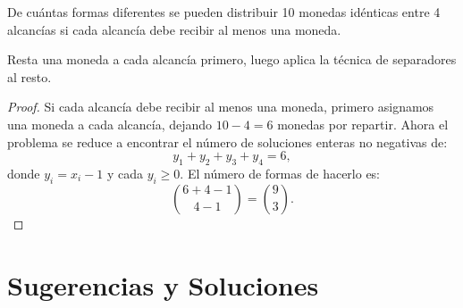\documentclass[11pt]{scrartcl}
\begin{document}
\begin{problem}
De cuántas formas diferentes se pueden distribuir 10 monedas idénticas entre 4 alcancías si cada alcancía debe recibir al menos una moneda.
\begin{hint}
Resta una moneda a cada alcancía primero, luego aplica la técnica de separadores al resto.
\begin{proof}
Si cada alcancía debe recibir al menos una moneda, primero asignamos una moneda a cada alcancía, dejando \(10 - 4 = 6\) monedas por repartir. Ahora el problema se reduce a encontrar el número de soluciones enteras no negativas de:
\[ y_1 + y_2 + y_3 + y_4 = 6, \]
donde \(y_i = x_i - 1\) y cada \(y_i \geq 0\). El número de formas de hacerlo es:
\[ \binom{6+4-1}{4-1} = \binom{9}{3}. \]
\end{proof}
\end{hint}
\end{problem}


\section{Sugerencias y Soluciones}
\begin{enumerate}

\end{enumerate}
\end{document}
